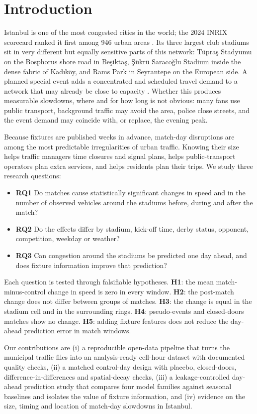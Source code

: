 \documentclass[conference]{IEEEtran}
\begin{document}
\section{Introduction}
Istanbul is one of the most congested cities in the world; the 2024 INRIX scorecard ranked it first among 946 urban areas \cite{inrix}. Its three largest club stadiums sit in very different but equally sensitive parts of this network: Tüpra\c{s} Stadyumu on the Bosphorus shore road in Be\c{s}ikta\c{s}, \c{S}ükrü Saraco\u{g}lu Stadium inside the dense fabric of Kad{\i}köy, and Rams Park in Seyrantepe on the European side. A planned special event adds a concentrated and scheduled travel demand to a network that may already be close to capacity \cite{fhwa2003}. Whether this produces measurable slowdowns, where and for how long is not obvious: many fans use public transport, background traffic may avoid the area, police close streets, and the event demand may coincide with, or replace, the evening peak.

Because fixtures are published weeks in advance, match-day disruptions are among the most predictable irregularities of urban traffic. Knowing their size helps traffic managers time closures and signal plans, helps public-transport operators plan extra services, and helps residents plan their trips. We study three research questions:
\begin{itemize}
\item \textbf{RQ1} Do matches cause statistically significant changes in speed and in the number of observed vehicles around the stadiums before, during and after the match?
\item \textbf{RQ2} Do the effects differ by stadium, kick-off time, derby status, opponent, competition, weekday or weather?
\item \textbf{RQ3} Can congestion around the stadiums be predicted one day ahead, and does fixture information improve that prediction?
\end{itemize}
Each question is tested through falsifiable hypotheses. \textbf{H1}: the mean match-minus-control change in speed is zero in every window. \textbf{H2}: the post-match change does not differ between groups of matches. \textbf{H3}: the change is equal in the stadium cell and in the surrounding rings. \textbf{H4}: pseudo-events and closed-doors matches show no change. \textbf{H5}: adding fixture features does not reduce the day-ahead prediction error in match windows.

Our contributions are (i) a reproducible open-data pipeline that turns the municipal traffic files into an analysis-ready cell-hour dataset with documented quality checks, (ii) a matched control-day design with placebo, closed-doors, difference-in-differences and spatial-decay checks, (iii) a leakage-controlled day-ahead prediction study that compares four model families against seasonal baselines and isolates the value of fixture information, and (iv) evidence on the size, timing and location of match-day slowdowns in Istanbul.
\end{document}
